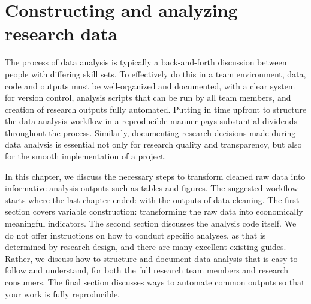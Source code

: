 \documentclass[
]{book}
\begin{document}
\hypertarget{analysis}{%
\chapter{Constructing and analyzing research data}\label{analysis}}

The process of data analysis is typically
a back-and-forth discussion between people
with differing skill sets.
To effectively do this in a team environment,
data, code and outputs must be well-organized and documented,
with a clear system for version control,
analysis scripts that can be run by all team members,
and creation of research outputs fully automated.
Putting in time upfront to structure the data analysis workflow
in a reproducible manner pays substantial dividends throughout the process.
Similarly, documenting research decisions made during data analysis
is essential not only for research quality and transparency,
but also for the smooth implementation of a project.

In this chapter, we discuss the necessary steps to transform
cleaned raw data into informative analysis outputs such as tables and figures.
The suggested workflow starts where the last chapter ended:
with the outputs of data cleaning.
The first section covers variable construction:
transforming the raw data into economically meaningful indicators.
The second section discusses the analysis code itself.
We do not offer instructions on how to conduct specific analyses,
as that is determined by research design,
and there are many excellent existing guides.
Rather, we discuss how to structure and document data analysis
that is easy to follow and understand,
for both the full research team members and research consumers.
The final section discusses ways to automate common outputs
so that your work is fully reproducible.
\end{document}
